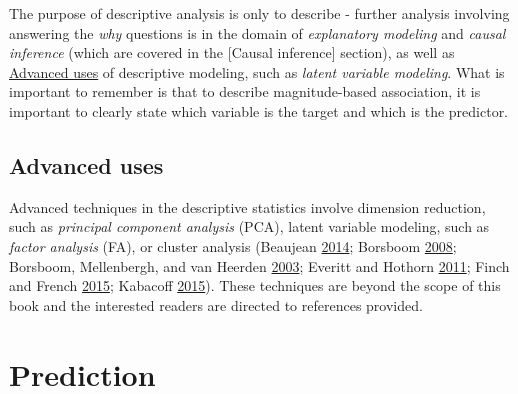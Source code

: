 \documentclass[
]{book}
\begin{document}
The purpose of descriptive analysis is only to describe - further analysis involving answering the \emph{why} questions is in the domain of \emph{explanatory modeling} and \emph{causal inference} (which are covered in the {[}Causal inference{]} section), as well as \protect\hyperlink{advanced-uses}{Advanced uses} of descriptive modeling, such as \emph{latent variable modeling}. What is important to remember is that to describe magnitude-based association, it is important to clearly state which variable is the target and which is the predictor.

\hypertarget{advanced-uses}{%
\section{Advanced uses}\label{advanced-uses}}

Advanced techniques in the descriptive statistics involve dimension reduction, such as \emph{principal component analysis} (PCA), latent variable modeling, such as \emph{factor analysis} (FA), or cluster analysis (Beaujean \protect\hyperlink{ref-beaujeanLatentVariableModeling2014}{2014}; Borsboom \protect\hyperlink{ref-borsboomLatentVariableTheory2008}{2008}; Borsboom, Mellenbergh, and van Heerden \protect\hyperlink{ref-borsboomTheoreticalStatusLatent2003}{2003}; Everitt and Hothorn \protect\hyperlink{ref-everittIntroductionAppliedMultivariate2011}{2011}; Finch and French \protect\hyperlink{ref-finchLatentVariableModeling2015}{2015}; Kabacoff \protect\hyperlink{ref-kabacoffActionDataAnalysis2015}{2015}). These techniques are beyond the scope of this book and the interested readers are directed to references provided.

\hypertarget{prediction}{%
\chapter{Prediction}\label{prediction}}
\end{document}
